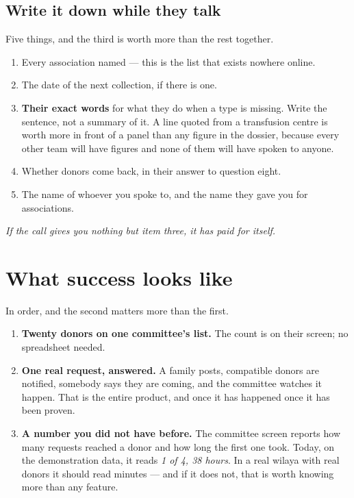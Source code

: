\documentclass[11pt,a4paper]{article}
\newcommand{\note}[1]{{\small\color{qatraGrey}\textit{#1}}}
\begin{document}
\subsection{Write it down while they talk}

Five things, and the third is worth more than the rest together.

\begin{enumerate}[leftmargin=1.4em]
  \item Every association named --- this is the list that exists nowhere online.
  \item The date of the next collection, if there is one.
  \item \textbf{Their exact words} for what they do when a type is missing.
        Write the sentence, not a summary of it. A line quoted from a
        transfusion centre is worth more in front of a panel than any figure in
        the dossier, because every other team will have figures and none of
        them will have spoken to anyone.
  \item Whether donors come back, in their answer to question eight.
  \item The name of whoever you spoke to, and the name they gave you for
        associations.
\end{enumerate}

\note{If the call gives you nothing but item three, it has paid for itself.}

\section{What success looks like}

In order, and the second matters more than the first.

\begin{enumerate}[leftmargin=1.4em]
  \item \textbf{Twenty donors on one committee's list.} The count is on their
        screen; no spreadsheet needed.
  \item \textbf{One real request, answered.} A family posts, compatible donors
        are notified, somebody says they are coming, and the committee watches
        it happen. That is the entire product, and once it has happened once it
        has been proven.
  \item \textbf{A number you did not have before.} The committee screen reports
        how many requests reached a donor and how long the first one took.
        Today, on the demonstration data, it reads \emph{1 of 4, 38 hours}. In a
        real wilaya with real donors it should read minutes --- and if it does
        not, that is worth knowing more than any feature.
\end{enumerate}
\end{document}

